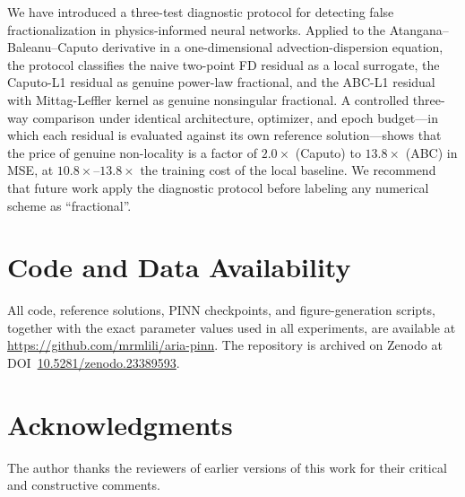 \documentclass[11pt]{article}
\begin{document}
We have introduced a three-test diagnostic protocol for detecting false fractionalization in physics-informed neural networks. Applied to the Atangana--Baleanu--Caputo derivative in a one-dimensional advection-dispersion equation, the protocol classifies the naive two-point FD residual as a local surrogate, the Caputo-L1 residual as genuine power-law fractional, and the ABC-L1 residual with Mittag-Leffler kernel as genuine nonsingular fractional. A controlled three-way comparison under identical architecture, optimizer, and epoch budget---in which each residual is evaluated against its own reference solution---shows that the price of genuine non-locality is a factor of \(2.0\times\) (Caputo) to \(13.8\times\) (ABC) in MSE, at \(10.8\times\)--\(13.8\times\) the training cost of the local baseline. We recommend that future work apply the diagnostic protocol before labeling any numerical scheme as ``fractional''.

\section*{Code and Data Availability}
\label{sec:code}
All code, reference solutions, PINN checkpoints, and figure-generation scripts, together with the exact parameter values used in all experiments, are available at \url{https://github.com/mrmlili/aria-pinn}. The repository is archived on Zenodo at DOI~\href{https://doi.org/10.5281/zenodo.23389593}{10.5281/zenodo.23389593}.

\section*{Acknowledgments}
The author thanks the reviewers of earlier versions of this work for their critical and constructive comments.
\end{document}
